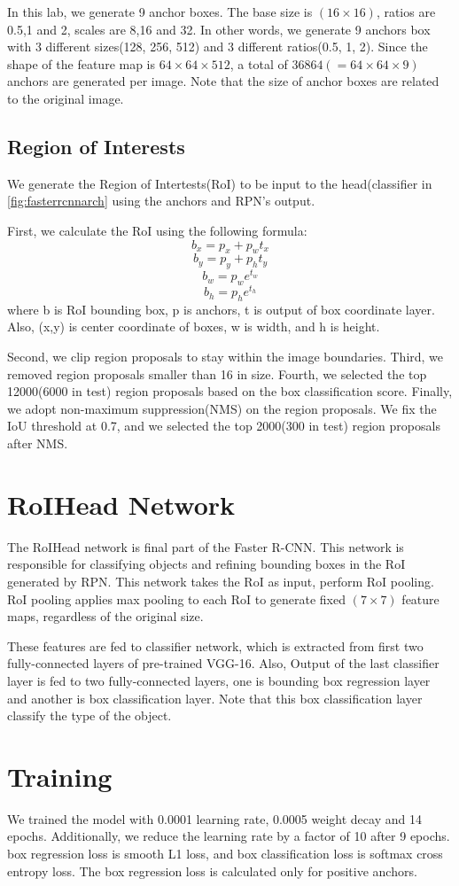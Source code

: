 \documentclass[extendedabs]{bmvc2k}
\begin{document}
In this lab, we generate 9 anchor boxes. The base size is $(16\times16)$, ratios are 0.5,1 and 2, scales are 8,16 and 32. In other words, we generate 9 anchors box with 3 different sizes(128, 256, 512) and 3 different ratios(0.5, 1, 2). Since the shape of the feature map is $64\times64\times512$, a total of $36864(=64\times64\times9)$ anchors are generated per image. Note that the size of anchor boxes are related to the original image.

\subsection{Region of Interests}
We generate the Region of Intertests(RoI) to be input to the head(classifier in \ref{fig:fasterrcnnarch} using the anchors and RPN's output.

First, we calculate the RoI using the following formula\cite{rcnn}:
$$
b_x = p_x + p_wt_x
$$
$$
b_y = p_y + p_ht_y
$$
$$
b_w = p_we^{t_w}
$$
$$
b_h = p_he^{t_h}
$$
where b is RoI bounding box, p is anchors, t is output of box coordinate layer. Also, (x,y) is center coordinate of boxes, w is width, and h is height.

Second, we clip region proposals to stay within the image boundaries. Third, we removed region proposals smaller than 16 in size. Fourth, we selected the top 12000(6000 in test) region proposals based on the box classification score. Finally, we adopt non-maximum suppression(NMS) on the region proposals. We fix the IoU threshold at 0.7, and we selected the top 2000(300 in test) region proposals after NMS.
\section{RoIHead Network}
The RoIHead network is final part of the Faster R-CNN\cite{fasterrcnn}. This network is responsible for classifying objects and refining bounding boxes in the RoI generated by RPN. This network takes the RoI as input, perform RoI pooling\cite{fastrcnn}. RoI pooling applies max pooling to each RoI to generate fixed $(7\times7)$ feature maps, regardless of the original size.

These features are fed to classifier network, which is extracted from first two fully-connected layers of pre-trained VGG-16. Also, Output of the last classifier layer is fed to two fully-connected layers, one is bounding box regression layer and another is box classification layer. Note that this box classification layer classify the type of the object.
\section{Training}
We trained the model with 0.0001 learning rate, 0.0005 weight decay and 14 epochs. Additionally, we reduce the learning rate by a factor of 10 after 9 epochs. box regression loss is smooth L1 loss\cite{fastrcnn}, and box classification loss is softmax cross entropy loss. The box regression loss is calculated only for positive anchors.
\end{document}
